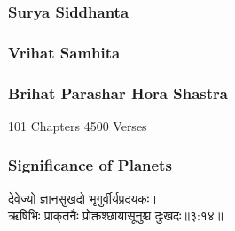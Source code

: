 \subsubsection{Surya Siddhanta}
\subsubsection{Vrihat Samhita}
\subsubsection{Brihat Parashar Hora Shastra}
101 Chapters
4500 Verses
\subsubsection{Significance of Planets}
\begin{sanskrit}
	\begin{center}
		देवेज्यो ज्ञानसुखदो भृगुर्वीर्यप्रदयकः।\\ऋषिभिः प्राक्‌तनैः प्रोक्तश्छायासूनुश्च दुःखदः॥३:१४॥\cite{BrihatParasharHoraShastraVol1}
	\end{center}
\end{sanskrit}